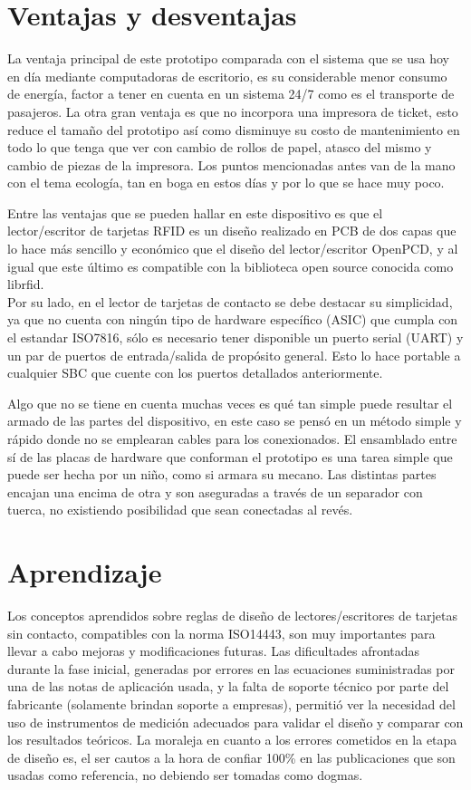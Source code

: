 \section{Ventajas y desventajas}
La ventaja principal de este prototipo comparada con el sistema que se usa hoy 
en día mediante computadoras de escritorio, es su considerable menor consumo de 
energía, factor a tener en cuenta en un sistema 24/7 como es el transporte de 
pasajeros.
La otra gran ventaja es que no incorpora una impresora de ticket, esto reduce el
tamaño del prototipo así como disminuye su costo de mantenimiento en todo lo que
tenga que ver con cambio de rollos de papel, atasco del mismo y cambio de piezas
de la impresora. 
Los puntos mencionadas antes van de la mano con el tema ecología, tan en boga
en estos días y por lo que se hace muy poco.

\bigskip
Entre las ventajas que se pueden hallar en este dispositivo es que el lector/escritor de tarjetas RFID es un diseño realizado en PCB de dos capas que lo hace más sencillo y económico que el diseño del lector/escritor OpenPCD, y al igual que este último es compatible con la biblioteca open source conocida como librfid.\\
Por su lado, en el lector de tarjetas de contacto se debe destacar su simplicidad, ya que no cuenta con ningún tipo de hardware específico (ASIC) que cumpla con el estandar ISO7816, sólo es necesario tener disponible un puerto serial (UART) y un par de puertos de entrada/salida de propósito general. Esto lo hace portable a cualquier SBC que cuente con los puertos detallados anteriormente.

\bigskip
Algo que no se tiene en cuenta muchas veces es qué tan simple puede resultar
el armado de las partes del dispositivo, en este caso se pensó en un 
método simple y rápido donde no se emplearan cables para los conexionados.
El ensamblado entre sí de las placas de hardware que conforman el prototipo es 
una tarea simple que puede ser hecha por un niño, como si armara su mecano.
Las distintas partes encajan una encima de otra y son aseguradas a través
de un separador con tuerca, no existiendo posibilidad que sean conectadas al 
revés.

\section{Aprendizaje}
Los conceptos aprendidos sobre reglas de diseño de lectores/escritores de 
tarjetas sin contacto, compatibles con la norma ISO14443, son muy importantes
para llevar a cabo mejoras y modificaciones futuras. Las dificultades afrontadas
durante la fase inicial, generadas por errores en las ecuaciones suministradas
por una de las notas de aplicación usada, y la falta de soporte técnico por
parte del fabricante (solamente brindan soporte a empresas), permitió ver la 
necesidad del uso de instrumentos de medición adecuados para validar el 
diseño y comparar con los resultados teóricos. La moraleja en cuanto a los errores cometidos en la etapa de diseño es, el ser cautos a la hora de confiar 100\% en las publicaciones que son usadas como referencia, no debiendo ser tomadas como dogmas.

